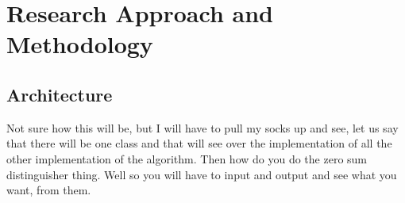 \chapter{Research Approach and Methodology}


\section{Architecture}
  Not sure how this will be, but I will have to pull my socks up and see, let us say that there will be one class
  and that will see over the implementation of all the other implementation of the algorithm. Then how do you do the
  zero sum distinguisher thing. Well so you will have to input and output and see what you want, from them.
